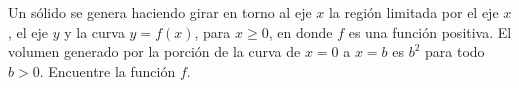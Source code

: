 \item Un sólido se genera haciendo girar en torno al eje $x$ la región limitada por el eje $x$, el eje $y$ y la curva $y = f(x)$, para $x \ge 0$, en donde $f$ es una función positiva. El volumen generado por la porción de la curva de $x = 0$ a $x = b$ es $b^2$ para todo $b > 0$. Encuentre la función $f$.
